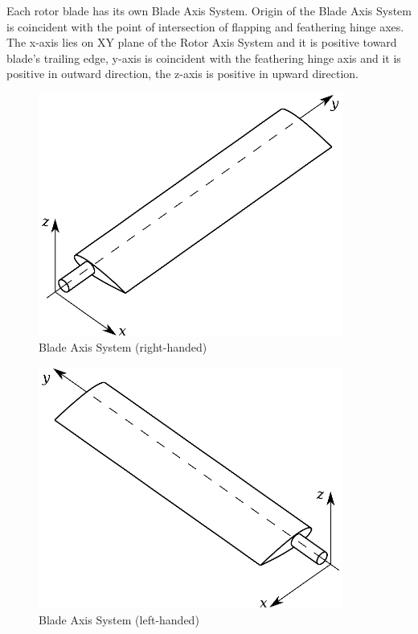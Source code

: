 Each rotor blade has its own Blade Axis System. Origin of the Blade Axis System is coincident with the point of intersection of flapping and feathering hinge axes. The x-axis lies on XY plane of the Rotor Axis System and it is positive toward blade's trailing edge, y-axis is coincident with the feathering hinge axis and it is positive in outward direction, the z-axis is positive in upward direction.

\begin{figure}
  \centering
  \includegraphics[width=100mm]{eps/coordinate_system_BAS_R.eps}
  \caption{Blade Axis System (right-handed)}
\end{figure}

\begin{figure}
  \centering
  \includegraphics[width=100mm]{eps/coordinate_system_BAS_L.eps}
  \caption{Blade Axis System (left-handed)}
\end{figure}

